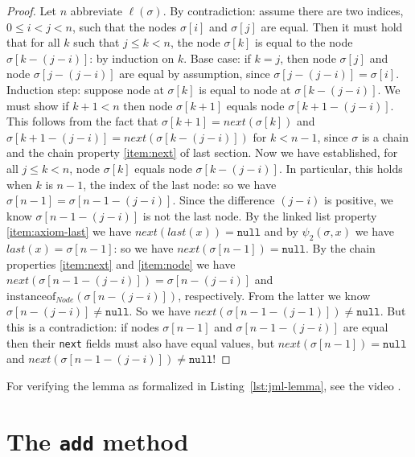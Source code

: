 \documentclass[runningheads]{llncs}
\theoremstyle{remark}
\begin{document}
\begin{proof}
Let $n$ abbreviate $\ell(\sigma)$. By contradiction: assume there are two indices, $0\leq i<j<n$, such that the nodes $\sigma[i]$ and $\sigma[j]$ are equal.
Then it must hold that for all $k$ such that $j \leq k < n$, the node $\sigma[k]$ is equal to the node $\sigma[k-(j-i)]$:
by induction on $k$.
Base case: if $k = j$, then node $\sigma[j]$ and node $\sigma[j-(j-i)]$ are equal by assumption, since $\sigma[j-(j-i)]=\sigma[i]$.
Induction step: suppose node at $\sigma[k]$ is equal to node at $\sigma[k-(j-i)]$.
We must show if $k+1<n$ then node $\sigma[k+1]$ equals node $\sigma[k+1-(j-i)]$.
This follows from the fact that $\sigma[k+1] = \mathit{next}(\sigma[k])$ and $\sigma[k+1-(j-i)] = \mathit{next}(\sigma[k-(j-i)])$ for $k<n-1$, since $\sigma$ is a chain and the chain property \ref{item:next} of last section.
Now we have established, for all $j \leq k < n$, node $\sigma[k]$ equals node $\sigma[k-(j-i)]$.
In particular, this holds when $k$ is $n-1$, the index of the last node:
so we have $\sigma[n-1] = \sigma[n-1-(j-i)]$.
Since the difference $(j-i)$ is positive, we know $\sigma[n-1-(j-i)]$ is not the last node.
By the linked list property \ref{item:axiom-last} we have $\mathit{next}(\mathit{last}(x))=\mathtt{null}$
and by $\psi_2(\sigma,x)$ we have $\mathit{last}(x)=\sigma[n-1]$:
so we have $\mathit{next}(\sigma[n-1])=\mathtt{null}$.
By the chain properties \ref{item:next} and \ref{item:node} we have $\mathit{next}(\sigma[n-1-(j-i)])=\sigma[n-(j-i)]$
and $\mathrm{instanceof}_\mathit{Node}(\sigma[n-(j-i)])$, respectively.
From the latter we know $\sigma[n-(j-i)]\neq\mathtt{null}$.
So we have $\mathit{next}(\sigma[n-1-(j-1)])\neq\mathtt{null}$.
But this is a contradiction: if nodes $\sigma[n-1]$ and $\sigma[n-1-(j-i)]$ are equal then their \texttt{next} fields must also have equal values, but $\mathit{next}(\sigma[n-1])=\mathtt{null}$ and $\mathit{next}(\sigma[n-1-(j-i)])\neq\mathtt{null}$!
\end{proof}



For verifying the lemma as formalized in Listing~\ref{lst:jml-lemma}, see the video .

\section{The \texttt{add} method}\label{sec:add}
\end{document}
